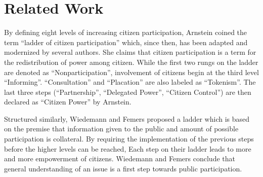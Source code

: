 \section{Related Work}




\label{chap:related_work}
By defining eight levels of increasing citizen participation, Arnstein \cite{Arnstein1969_citizen_participation} coined the term ``ladder of citizen participation'' which, since then, has been adapted and modernized \cite{Connor1988_new_ladder,carver2003future,Collins2009_social_learning,you2009_participatory_map_based,Cai2009_spatial_annotation_deliberation,Macintosh2004_eParticipation_characterization,Schlossberg2005_PPGIS} by several authors. She claims that citizen participation is a term for the redistribution of power among citizen. While the first two rungs on the ladder are denoted as ``Nonparticipation'', involvement of citizens begin at the third level ``Informing''. ``Consultation'' and ``Placation'' are also labeled as ``Tokenism''. The last three steps (``Partnership'', ``Delegated Power'', ``Citizen Control'') are then declared as ``Citizen Power'' by Arnstein.

Structured similarly, Wiedemann and Femers \cite{Wiedemann1993355} proposed a ladder which is based on the premise that information given to the public and amount of possible participation is collateral. By requiring the implementation of the previous steps before the higher levels can be reached, Each step on their ladder leads to more and more empowerment of citizens. Wiedemann and Femers conclude that general understanding of an issue is a first step towards public participation.

